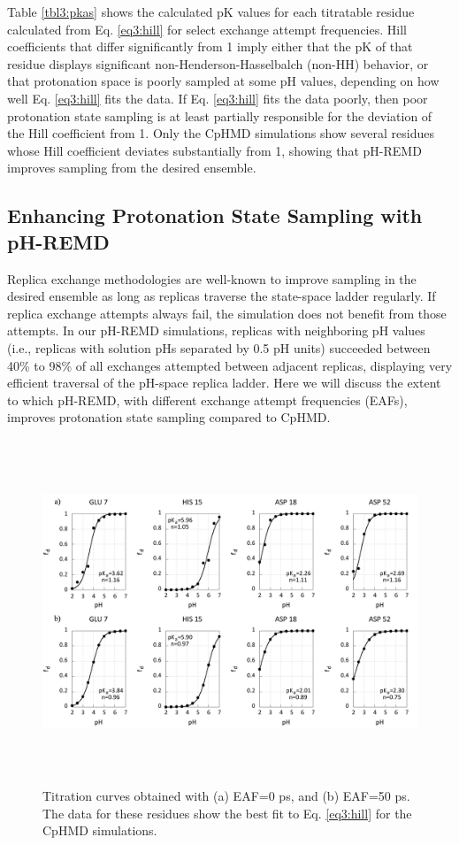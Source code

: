 Table \ref{tbl3:pkas} shows the calculated pK values for each titratable
residue calculated from Eq. \ref{eq3:hill} for select exchange attempt
frequencies.  Hill coefficients that differ significantly from 1 imply either
that the pK of that residue displays significant
non-Henderson-Hasselbalch (non-HH) behavior, or that protonation space is poorly
sampled at some pH values, depending on how well Eq. \ref{eq3:hill} fits the
data. If Eq. \ref{eq3:hill} fits the data poorly, then poor protonation state
sampling is at least partially responsible for the deviation of the Hill
coefficient from 1. Only the CpHMD simulations show several residues whose Hill
coefficient deviates substantially from 1, showing that pH-REMD improves
sampling from the desired ensemble.

\subsection{Enhancing Protonation State Sampling with pH-REMD}

Replica exchange methodologies are well-known to improve sampling in the desired
ensemble \cite{Sugita1999,Chodera2011} as long as replicas traverse the
state-space ladder regularly.  If replica exchange attempts always fail, the
simulation does not benefit from those attempts.  In our pH-REMD simulations,
replicas with neighboring pH values (i.e., replicas with solution pHs separated
by 0.5 pH units) succeeded between 40\% to 98\% of all exchanges attempted
between adjacent replicas, displaying very efficient traversal of the pH-space
replica ladder. Here we will discuss the extent to which pH-REMD, with different
exchange attempt frequencies (EAFs), improves protonation state sampling
compared to CpHMD.

\begin{figure}
 \includegraphics[width=6.5in, height=4.06in]{Comparison_good_curves.png}
 \caption{Titration curves obtained with (a) EAF=0 ps, and (b) EAF=50
          ps. The data for these residues show the best fit to Eq.
          \ref{eq3:hill} for the CpHMD simulations.}
 \label{fig3:GoodTitr}
\end{figure}


